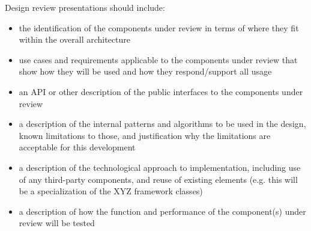 Design review presentations should include:
\begin{itemize}
\item the identification of the components under review in terms of where they fit within the overall architecture
\item use cases and requirements applicable to the components under review that show how they will be used and how they respond/support all usage
\item an API or other description of the public interfaces to the components under review
\item a description of the internal patterns and algorithms to be used in the design, known limitations to those, and justification why the limitations are acceptable for this development
\item a description of the technological approach to implementation, including use of any third-party components, and reuse of existing elements (e.g. this will be a specialization of the XYZ framework classes)
\item a description of how the function and performance of the component(s) under review will be tested
\end{itemize}
